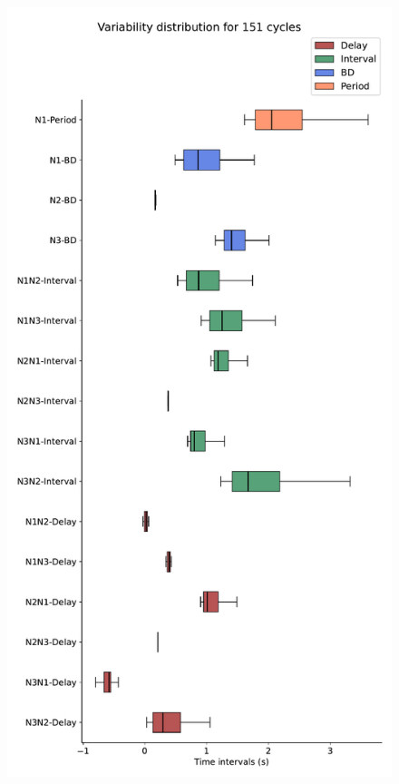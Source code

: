 \begin{figure}[hbt!]
	\begin{minipage}[b]{0.45\textwidth}
		\centering
		\includegraphics[width=\textwidth]{invariants/data/MODEL/so_driven/images/3phases/_boxplot.pdf}
	\end{minipage}

\end{figure}
